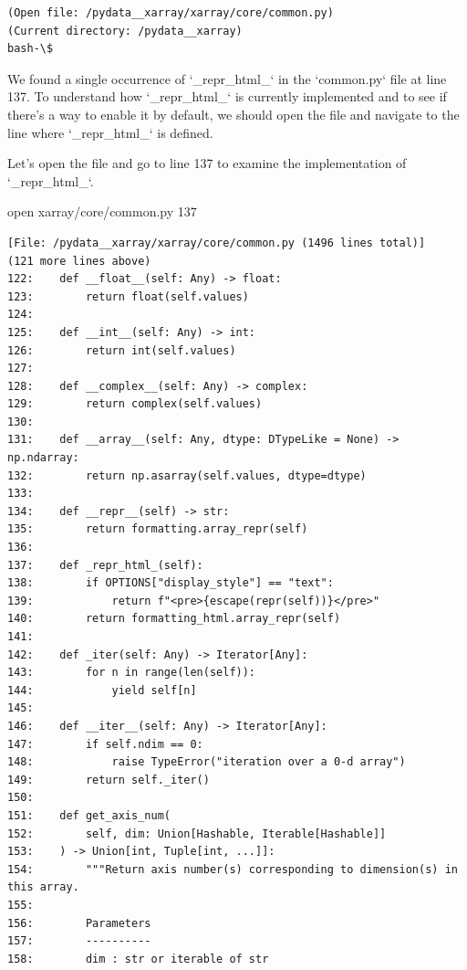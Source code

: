 {\begin{observationbox}
\begin{Verbatim}[breaklines=true, breakanywhere=true]
(Open file: /pydata__xarray/xarray/core/common.py)
(Current directory: /pydata__xarray)
bash-\$
\end{Verbatim}
\end{observationbox}
\begin{agentbox}
We found a single occurrence of `\_repr\_html\_` in the `common.py` file at line 137. To understand how `\_repr\_html\_` is currently implemented and to see if there's a way to enable it by default, we should open the file and navigate to the line where `\_repr\_html\_` is defined.



Let's open the file and go to line 137 to examine the implementation of `\_repr\_html\_`.



\hrulefill
\begin{CodeVerbatim}[breaklines=true, breakanywhere=true]
open xarray/core/common.py 137
\end{CodeVerbatim}
\end{agentbox}
\begin{observationbox}\begin{Verbatim}[breaklines=true, breakanywhere=true]
[File: /pydata__xarray/xarray/core/common.py (1496 lines total)]
(121 more lines above)
122:    def __float__(self: Any) -> float:
123:        return float(self.values)
124:
125:    def __int__(self: Any) -> int:
126:        return int(self.values)
127:
128:    def __complex__(self: Any) -> complex:
129:        return complex(self.values)
130:
131:    def __array__(self: Any, dtype: DTypeLike = None) -> np.ndarray:
132:        return np.asarray(self.values, dtype=dtype)
133:
134:    def __repr__(self) -> str:
135:        return formatting.array_repr(self)
136:
137:    def _repr_html_(self):
138:        if OPTIONS["display_style"] == "text":
139:            return f"<pre>{escape(repr(self))}</pre>"
140:        return formatting_html.array_repr(self)
141:
142:    def _iter(self: Any) -> Iterator[Any]:
143:        for n in range(len(self)):
144:            yield self[n]
145:
146:    def __iter__(self: Any) -> Iterator[Any]:
147:        if self.ndim == 0:
148:            raise TypeError("iteration over a 0-d array")
149:        return self._iter()
150:
151:    def get_axis_num(
152:        self, dim: Union[Hashable, Iterable[Hashable]]
153:    ) -> Union[int, Tuple[int, ...]]:
154:        """Return axis number(s) corresponding to dimension(s) in this array.
155:
156:        Parameters
157:        ----------
158:        dim : str or iterable of str

\end{Verbatim}
\end{observationbox}}
